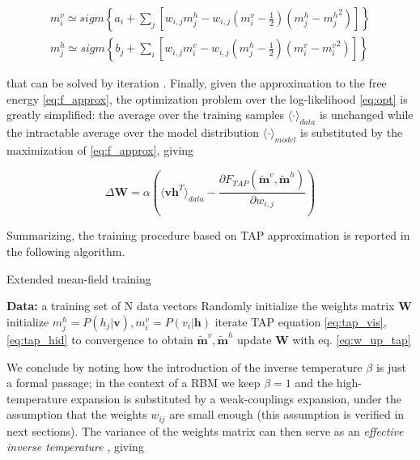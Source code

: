 \documentclass[notitlepage]{revtex4-1}
\begin{document}
\begin{align}
m_i^v \simeq sigm \left\{ a_i + \sum_j \left[ w_{i,j} m_j^h - w_{i,j} \left( m_i^v - \frac{1}{2} \right) \left( m_j^h - {m_j^h}^2 \right) \right] \right\} \label{eq:tap_vis} \\
m_j^h \simeq sigm \left\{ b_j + \sum_i \left[ w_{i,j} m_i^v - w_{i,j} \left( m_j^h - \frac{1}{2} \right) \left( m_i^v - {m_i^v}^2 \right) \right] \right\} \label{eq:tap_hid}
\end{align}

that can be solved by iteration \cite{conv}. Finally, given the approximation to the free energy \eqref{eq:f_approx}, the optimization problem over the log-likelihood \eqref{eq:opt} is greatly simplified: the average over the training samples \(\textstyle \langle \cdot \rangle_{data}\) is unchanged while the intractable average over the model distribution \(\textstyle \langle \cdot \rangle_{model}\) is substituted by the maximization of \eqref{eq:f_approx}, giving

\begin{equation}
\Delta \mathbf{W} = \alpha \left( \langle \mathbf{v h}^T \rangle_{data} - \frac{\partial F_{TAP}(\mathbf{\tilde{m}}^v, \mathbf{\tilde{m}}^h)}{\partial w_{i,j}} \right)
\label{eq:w_up_tap}
\end{equation}

Summarizing, the training procedure based on TAP approximation is reported in the following algorithm.

\begin{algorithm}[H]
\caption{Extended mean-field training}\label{alg:tap}
\begin{algorithmic}[1]
\State \textbf{Data:} a training set of N data vectors
\State Randomly initialize the weights matrix \textbf{W}
    \State initialize  \(m_j^h=P(h_j|\mathbf{v}),m_i^v=P(v_i|\mathbf{h})\)
    \State iterate TAP equation \eqref{eq:tap_vis},\eqref{eq:tap_hid} to convergence to obtain \(\tilde{\mathbf{m}}^v,\tilde{\mathbf{m}}^h\)
    \State update \(\mathbf{W}\) with eq. \eqref{eq:w_up_tap}
  \EndFor
\EndFor
\end{algorithmic}
\end{algorithm}

We conclude by noting how the introduction of the inverse temperature \(\beta\) is just a formal passage; in the context of a RBM we keep \(\beta = 1\) and the high-temperature expansion is substituted by a weak-couplings expansion, under the assumption that the weights \(w_{ij}\) are small enough (this assumption is verified in next sections). The variance of the weights matrix can then serve as an \textit{effective inverse temperature} \cite{monasson}, giving
\end{document}
